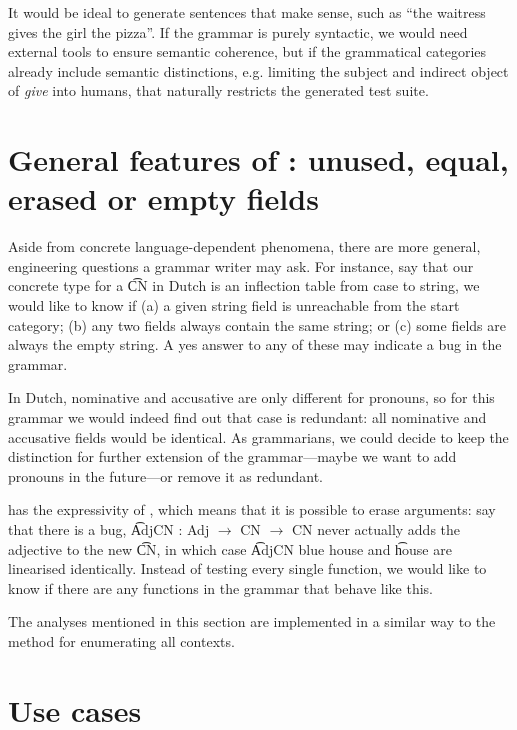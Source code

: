 It would be ideal to generate sentences that make sense,
such as ``the waitress gives the girl the pizza''. If the grammar is
purely syntactic, we would need external tools to ensure semantic
coherence, but if the grammatical categories already include semantic
distinctions, e.g. limiting the subject and indirect object of
\emph{give} into humans, that naturally restricts the generated test
suite.

\section{General features of \pmcfg: unused, equal,
  erased or empty fields}

Aside from concrete language-dependent phenomena, there are more
general, engineering questions a grammar writer may ask. For instance, say that our
concrete type for a \t{CN} in Dutch is an inflection table from case
to string, we would like to know if (a) a given string field is unreachable from the start category; (b) any two fields always contain the same string; or (c) some fields
are always the empty string. A yes answer to any of these may indicate a bug in the grammar.

In Dutch, nominative and accusative are only different for
pronouns, so for this grammar we would indeed find out that case is
redundant: all nominative and accusative fields would be
identical. As grammarians, we could decide to keep the distinction for
further extension of the grammar---maybe we want to add pronouns in
the future---or remove it as redundant.

\gf{} has the expressivity of \pmcfg{}, which means that it is
possible to erase arguments: say that there is a bug, \t{AdjCN : Adj
  $\rightarrow$ CN  $\rightarrow$ CN} never actually adds the
adjective to the new \t{CN}, in which case \t{AdjCN blue house} and
\t{house} are linearised identically. Instead of testing every single
function, we would like to know if there are any functions in the
grammar that behave like this.

The analyses mentioned in this section are implemented in a similar way to the method for enumerating all contexts.

\section{Use cases}

